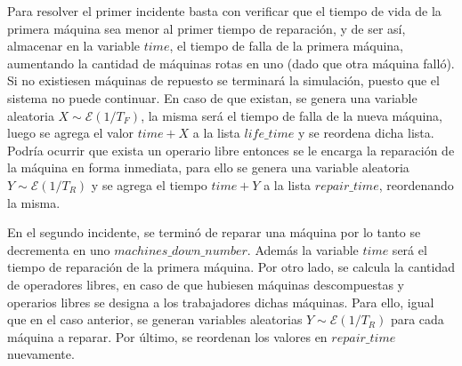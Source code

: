   \par Para resolver el primer incidente basta con verificar que el tiempo de vida de la primera máquina sea menor al
  primer tiempo de reparación, y de ser así, almacenar en la variable $time$, el tiempo de falla de la primera máquina,
  aumentando la cantidad de máquinas rotas en uno (dado que otra máquina falló). Si no existiesen máquinas de repuesto
  se terminará la simulación, puesto que el sistema no puede continuar. En caso de que existan, se genera una variable
  aleatoria $X \sim \mathcal{E}(1/T_F)$, la misma será el tiempo de falla de la nueva máquina, luego se agrega el valor
  $time + X$ a la lista $life\_time$ y se reordena dicha lista. Podría ocurrir que exista un operario libre entonces se
  le encarga la reparación de la máquina en forma inmediata, para ello se genera una variable aleatoria
  $Y \sim \mathcal{E}(1/T_R)$ y se agrega el tiempo $time + Y$ a la lista $repair\_time$, reordenando la
  misma.

  \par En el segundo incidente, se terminó de reparar una máquina por lo tanto se decrementa en uno
  $machines\_down\_number$. Además la variable $time$ será el tiempo de reparación de la primera máquina. Por otro
  lado, se calcula la cantidad de operadores libres, en caso de que hubiesen máquinas descompuestas y operarios libres
  se designa a los trabajadores dichas máquinas. Para ello, igual que en el caso anterior, se generan variables
  aleatorias $Y \sim \mathcal{E}(1/T_R)$ para cada máquina a reparar. Por último, se reordenan los valores en
  $repair\_time$ nuevamente.


